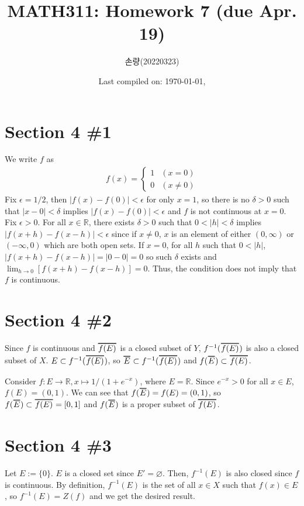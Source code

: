 \documentclass{scrartcl}
\title{MATH311: Homework 7 (due Apr. 19)}
\author{손량(20220323)}
\date{Last compiled on: \today, \currenttime}
\newcommand\Overline[2][0.8pt]{%
  \begin{tikzpicture}[baseline=(a.base)]
    \node[inner xsep=0pt,inner ysep=1.5pt] (a) {$#2$};
    \draw[line width= #1] (a.north west) -- (a.north east);
  \end{tikzpicture}
}
\begin{document}
\maketitle

\section{Section 4 \#1}
We write \(f\) as
\begin{align*}
  f(x) = \begin{cases}
    1 & (x = 0) \\
    0 & (x \not = 0)
  \end{cases}
\end{align*}
Fix \(\epsilon = 1 / 2\), then \(|f(x) - f(0)| < \epsilon\) for only \(x = 1\), so there is no \(\delta > 0\) such that \(|x - 0| < \delta\) implies \(|f(x) - f(0)| < \epsilon\) and \(f\) is not continuous at \(x = 0\).
Fix \(\epsilon > 0\).
For all \(x \in \mathbb{R}\), there exists \(\delta > 0\) such that \(0 < |h| < \delta\) implies \(|f(x + h) - f(x - h)| < \epsilon\) since if \(x \not = 0\), \(x\) is an element of either \((0, \infty)\) or \((-\infty, 0)\) which are both open sets.
If \(x = 0\), for all \(h\) such that \(0 < |h|\), \(|f(x + h) - f(x - h)| = |0 - 0| = 0\) so such \(\delta\) exists and \(\lim_{h \to 0} [f(x + h) - f(x - h)] = 0\).
Thus, the condition does not imply that \(f\) is continuous.

\section{Section 4 \#2}
Since \(f\) is continuous and \(\Overline{f(E)}\) is a closed subset of \(Y\), \(f^{-1}(\Overline{f(E)})\) is also a closed subset of \(X\).
\(E \subset f^{-1}(\Overline{f(E)})\), so \(\Overline{E} \subset f^{-1}(\Overline{f(E)})\) and \(f(\Overline{E}) \subset \Overline{f(E)}\).

Consider \(f: E \to \mathbb{R}, x \mapsto 1 / (1 + e^{-x})\), where \(E = \mathbb{R}\).
Since \(e^{-x} > 0\) for all \(x \in E\), \(f(E) = (0, 1)\).
We can see that \(f(\Overline{E}) = f(E) = (0, 1)\), so \(f(\Overline{E}) \subset \Overline{f(E)} = [0, 1]\) and \(f(\Overline{E})\) is a proper subset of \(\Overline{f(E)}\).

\section{Section 4 \#3}
Let \(E := \{0\}\).
\(E\) is a closed set since \(E' = \varnothing\).
Then, \(f^{-1}(E)\) is also closed since \(f\) is continuous.
By definition, \(f^{-1}(E)\) is the set of all \(x \in X\) such that \(f(x) \in E\), so \(f^{-1}(E) = Z(f)\) and we get the desired result.
\end{document}
